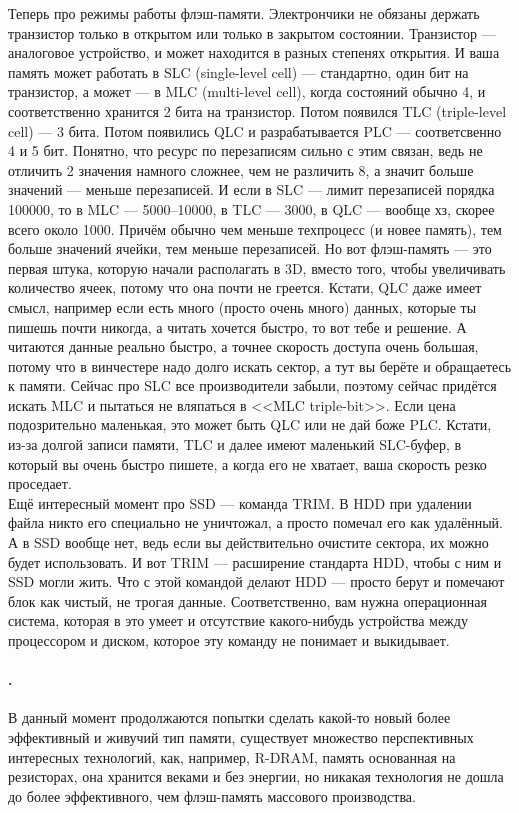 \documentclass{article}
\begin{document}
    Теперь про режимы работы флэш-памяти. Электрончики не обязаны держать транзистор только в открытом или только в закрытом состоянии. Транзистор --- аналоговое устройство, и может находится в разных степенях открытия. И ваша память может работать в SLC (single-level cell) --- стандартно, один бит на транзистор, а может --- в MLC (multi-level cell), когда состояний обычно 4, и соответственно хранится 2 бита на транзистор. Потом появился TLC (triple-level cell) --- 3 бита. Потом появились QLC и разрабатывается PLC --- соответсвенно 4 и 5 бит. Понятно, что ресурс по перезаписям сильно с этим связан, ведь не отличить 2 значения намного сложнее, чем не различить 8, а значит больше значений --- меньше перезаписей. И если в SLC --- лимит перезаписей порядка 100000, то в MLC --- 5000--10000, в TLC --- 3000, в QLC --- вообще хз, скорее всего около 1000. Причём обычно чем меньше техпроцесс (и новее память), тем больше значений ячейки, тем меньше перезаписей. Но вот флэш-память --- это первая штука, которую начали располагать в 3D, вместо того, чтобы увеличивать количество ячеек, потому что она почти не греется. Кстати, QLC даже имеет смысл, например если есть много (просто очень много) данных, которые ты пишешь почти никогда, а читать хочется быстро, то вот тебе и решение. А читаются данные реально быстро, а точнее скорость доступа очень большая, потому что в винчестере надо долго искать сектор, а тут вы берёте и обращаетесь к памяти. Сейчас про SLC все производители забыли, поэтому сейчас придётся искать MLC и пытаться не вляпаться в <<MLC triple-bit>>. Если цена подозрительно маленькая, это может быть QLC или не дай боже PLC. Кстати, из-за долгой записи памяти, TLC и далее имеют маленький SLC-буфер, в который вы очень быстро пишете, а когда его не хватает, ваша скорость резко проседает.\\
    Ещё интересный момент про SSD --- команда TRIM. В HDD при удалении файла никто его специально не уничтожал, а просто помечал его как удалённый. А в SSD вообще нет, ведь если вы действительно очистите сектора, их можно будет использовать. И вот TRIM --- расширение стандарта HDD, чтобы с ним и SSD могли жить. Что с этой командой делают HDD --- просто берут и помечают блок как чистый, не трогая данные. Соответственно, вам нужна операционная система, которая в это умеет и отсутствие какого-нибудь устройства между процессором и диском, которое эту команду не понимает и выкидывает.
    \paragraph{.}
    В данный момент продолжаются попытки сделать какой-то новый более эффективный и живучий тип памяти, существует множество перспективных интересных технологий, как, например, R-DRAM, память основанная на резисторах, она хранится веками и без энергии, но никакая технология не дошла до более эффективного, чем флэш-память массового производства.
\end{document}
